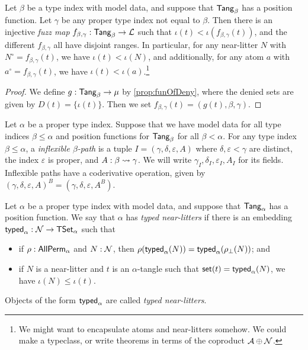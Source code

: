 \begin{proposition}
  \label{prop:fuzz}
  Let \( \beta \) be a type index with model data, and suppose that \( \mathsf{Tang}_\beta \) has a position function.
  Let \( \gamma \) be any proper type index not equal to \( \beta \).
  Then there is an injective \emph{fuzz map} \( f_{\beta,\gamma} : \mathsf{Tang}_\beta \to {\mathcal L} \) such that \( \iota(t) < \iota(f_{\beta,\gamma}(t)) \), and the different \( f_{\beta,\gamma} \) all have disjoint ranges.
  In particular, for any near-litter \( N \) with \( N^\circ = f_{\beta,\gamma}(t) \), we have \( \iota(t) < \iota(N) \), and additionally, for any atom \( a \) with \( a^\circ = f_{\beta,\gamma}(t) \), we have \( \iota(t) < \iota(a) \).\footnote{We might want to encapsulate atoms and near-litters somehow. We could make a typeclass, or write theorems in terms of the coproduct \( {\mathcal A} \oplus {\mathcal N} \).}
\end{proposition}
\begin{proof}
  We define \( g : \mathsf{Tang}_\beta \to \mu \) by \cref{prop:funOfDeny}, where the denied sets are given by \( D(t) = \{ \iota(t) \} \).
  Then we set \( f_{\beta,\gamma}(t) = (g(t), \beta, \gamma) \).
\end{proof}
\begin{definition}
  \label{def:InflexiblePath}
  Let \( \alpha \) be a proper type index.
  Suppose that we have model data for all type indices \( \beta \leq \alpha \) and position functions for \( \mathsf{Tang}_\beta \) for all \( \beta < \alpha \).
  For any type index \( \beta \leq \alpha \), a \emph{inflexible \( \beta \)-path} is a tuple \( I = (\gamma, \delta, \varepsilon, A) \) where \( \delta, \varepsilon < \gamma \) are distinct, the index \( \varepsilon \) is proper, and \( A : \beta \rightsquigarrow \gamma \).
  We will write \( \gamma_I, \delta_I, \varepsilon_I, A_I \) for its fields.
  Inflexible paths have a coderivative operation, given by \( (\gamma, \delta, \varepsilon, A)^B = (\gamma, \delta, \varepsilon, A^B) \).
\end{definition}
\begin{definition}
  \label{def:TypedNearLitter}
  Let \( \alpha \) be a proper type index with model data, and suppose that \( \mathsf{Tang}_\alpha \) has a position function.
  We say that \( \alpha \) has \emph{typed near-litters} if there is an embedding \( \operatorname{\mathsf{typed}}_\alpha : {\mathcal N} \to \mathsf{TSet}_\alpha \) such that
  \begin{itemize}
    \item if \( \rho : \mathsf{AllPerm}_\alpha \) and \( N : {\mathcal N} \), then \( \rho(\operatorname{\mathsf{typed}}_\alpha(N)) = \operatorname{\mathsf{typed}}_\alpha(\rho_\bot(N)) \); and
    \item if \( N \) is a near-litter and \( t \) is an \( \alpha \)-tangle such that \( \operatorname{\mathsf{set}}(t) = \operatorname{\mathsf{typed}}_\alpha(N) \), we have \( \iota(N) \leq \iota(t) \).
  \end{itemize}
  Objects of the form \( \operatorname{\mathsf{typed}}_\alpha \) are called \emph{typed near-litters}.
\end{definition}
